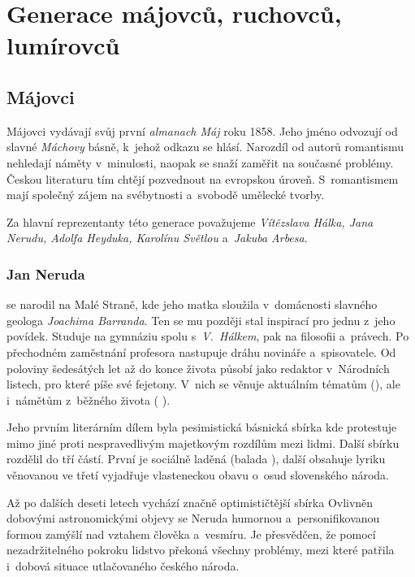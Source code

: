\chapter{Generace májovců, ruchovců, lumírovců}
\section{Májovci}
Májovci vydávají svůj první \emph{almanach Máj} roku 1858. Jeho jméno odvozují
od slavné \emph{Máchovy} básně, k~jehož odkazu se hlásí. Narozdíl od autorů
romantismu nehledají náměty v~minulosti, naopak se snaží zaměřit na
současné problémy. Českou literaturu tím chtějí pozvednout na evropskou
úroveň. S~romantismem mají společný zájem na svébytnosti a~svobodě
umělecké tvorby.

Za hlavní reprezentanty této generace považujeme \emph{Vítězslava Hálka, Jana
Nerudu, Adolfa Heyduka, Karolínu Světlou} a~\emph{Jakuba Arbesa}.

\subsection*{Jan Neruda}
 se narodil na Malé Straně, kde jeho matka sloužila 
v~domácnosti slavného geologa \emph{Joachima Barranda}. Ten se mu
později stal inspirací pro jednu z~jeho povídek. Studuje na gymnáziu
spolu s~\emph{V.~Hálkem}, pak na filosofii a~právech. Po přechodném
zaměstnání profesora nastupuje dráhu novináře a~spisovatele. Od poloviny
šedesátých let až do konce života působí jako redaktor v~Národních
listech, pro které píše své fejetony. V~nich se věnuje aktuálním tématům
(), ale  i~námětům z~běžného života (
).

Jeho prvním literárním dílem byla pesimistická básnická sbírka
 kde protestuje mimo jiné proti nespravedlivým
majetkovým rozdílům mezi lidmi. Další sbírku  rozdělil
do tří částí. První je sociálně laděná (balada ),
další obsahuje lyriku věnovanou  ve třetí
vyjadřuje vlasteneckou obavu o~osud slovenského národa.

Až po dalších deseti letech vychází značně optimističtější sbírka
 Ovlivněn dobovými astronomickými objevy se Neruda
humornou a~personifikovanou formou zamýšlí nad vztahem člověka
a~vesmíru. Je přesvědčen, že pomocí nezadržitelného pokroku lidstvo
překoná všechny problémy, mezi které patřila i~dobová situace
utlačovaného českého národa.

